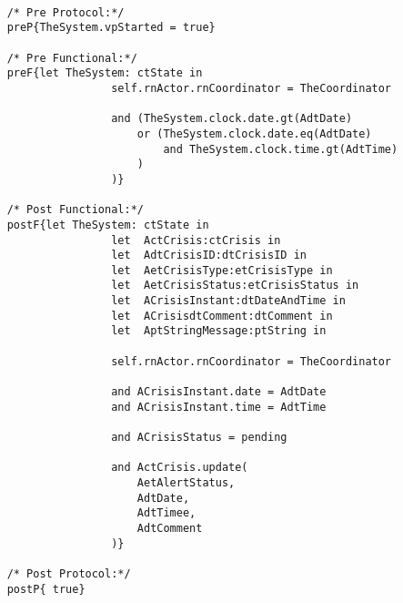	\scriptsize
	\vspace{0.5cm}
	\begin{lstlisting}[style=MessirStyle,firstnumber=auto,captionpos=b,caption={\msrmessir (MCL-oriented) specification of the operation \emph{oeUpdateCrisis}.},label=OM-actCoordinator-oeUpdateCrisis-MCL-LST]

	/* Pre Protocol:*/ 
	preP{TheSystem.vpStarted = true}
	
	/* Pre Functional:*/
	preF{let TheSystem: ctState in
					self.rnActor.rnCoordinator = TheCoordinator
	  
					and (TheSystem.clock.date.gt(AdtDate)
	       				or (TheSystem.clock.date.eq(AdtDate)
	           				and TheSystem.clock.time.gt(AdtTime)
	          			)
	      			)}
	
	/* Post Functional:*/ 
	postF{let TheSystem: ctState in
					let  ActCrisis:ctCrisis in
					let  AdtCrisisID:dtCrisisID in
					let  AetCrisisType:etCrisisType in
					let  AetCrisisStatus:etCrisisStatus in
					let  ACrisisInstant:dtDateAndTime in
					let  ACrisisdtComment:dtComment in
					let  AptStringMessage:ptString in
					
					self.rnActor.rnCoordinator = TheCoordinator
					
					and ACrisisInstant.date = AdtDate
					and ACrisisInstant.time = AdtTime
					
					and ACrisisStatus = pending
					
					and ActCrisis.update(
						AetAlertStatus,
						AdtDate,
	 					AdtTimee,
	 					AdtComment
					)}
	
	/* Post Protocol:*/ 
	postP{ true}
	
	\end{lstlisting}
	\normalsize 
	
	
	
	





